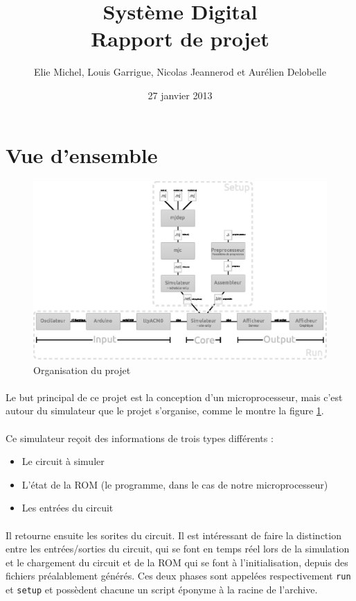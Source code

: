 \documentclass{article}
\title{Système Digital\\Rapport de projet}
\author{Elie Michel, Louis Garrigue, Nicolas Jeannerod et Aurélien Delobelle}
\date{27 janvier 2013}
\begin{document}
\maketitle

\section{Vue d'ensemble}

\begin{figure}[h]
\centering
\includegraphics{organisation.eps}
\caption{\label{orga} Organisation du projet}
\end{figure}
\paragraph{}Le but principal de ce projet est la conception d'un microprocesseur, mais c'est autour du simulateur que le projet s'organise, comme le montre la figure \ref{orga}.

\paragraph{}Ce simulateur reçoit des informations de trois types différents :
\begin{itemize}
	\item Le circuit à simuler
	\item L'état de la ROM (le programme, dans le cas de notre microprocesseur)
	\item Les entrées du circuit
\end{itemize}

\paragraph{}Il retourne ensuite les sorites du circuit. Il est intéressant de faire la distinction entre les entrées/sorties du circuit, qui se font en temps réel lors de la simulation et le chargement du circuit et de la ROM qui se font à l'initialisation, depuis des fichiers préalablement générés. Ces deux phases sont appelées respectivement \texttt{run} et \texttt{setup} et possèdent chacune un script éponyme à la racine de l'archive.
\end{document}
